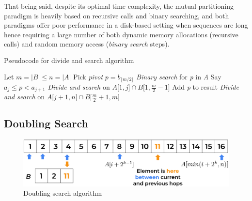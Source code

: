 That being said, despite its optimal time complexity, the mutual-partitioning paradigm is heavily based on recursive calls and binary searching, and both paradigms offer poor performance in a disk-based setting when sequences are long hence requiring a large number of both dynamic memory allocations (recursive calls) and random memory access (\textit{binary search} steps).

\begin{algorithm}
    \captionsetup{labelsep=newline}
    \caption{Pseudocode for divide and search algorithm \label{alg:divandsearch}}
    \begin{algorithmic}[1]
        \State Let $m=|B| \leq n=|A|$
        \State Pick \textit{pivot} $p=b_{\lfloor m/2 \rfloor}$
        \State \textit{Binary search} for \textit{p} in \textit{A} \Comment Say $a_j \leq p < a_{j+1}$
        \State \textit{Divide and search} on $A\big[1, j\big] \cap B\big[1, \frac{m}{2}-1\big]$
            \State Add \textit{p} to result
        \EndIf
        \State \textit{Divide and search} on $A\big[ j+1, n\big] \cap B\big[\frac{m}{2}+1, m\big]$
    \end{algorithmic}
\end{algorithm}

\subsection{Doubling Search \label{galloping}}

\begin{figure}[H] 
    \begin{center}
        \includegraphics[width=.8\textwidth]{imgs/galloping.png}
        \caption{Doubling search algorithm \label{fig:galloping}}
    \end{center}
\end{figure}

